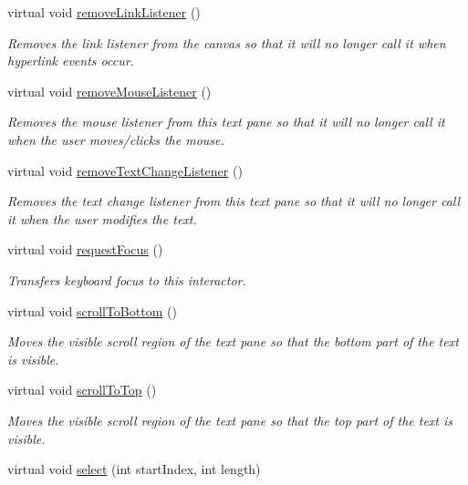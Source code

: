 \begin{DoxyCompactItemize}
virtual void \mbox{\hyperlink{classGBrowserPane_a263a2282597ca9f0f73301fb202ae390}{remove\+Link\+Listener}} ()
\begin{DoxyCompactList}\small\item\em Removes the link listener from the canvas so that it will no longer call it when hyperlink events occur. \end{DoxyCompactList}\item 
virtual void \mbox{\hyperlink{classGBrowserPane_aff47f71ce47e688a07c9d38dc92fcc11}{remove\+Mouse\+Listener}} ()
\begin{DoxyCompactList}\small\item\em Removes the mouse listener from this text pane so that it will no longer call it when the user moves/clicks the mouse. \end{DoxyCompactList}\item 
virtual void \mbox{\hyperlink{classGBrowserPane_a69c940b99d01eb7c353763ce4b0942a4}{remove\+Text\+Change\+Listener}} ()
\begin{DoxyCompactList}\small\item\em Removes the text change listener from this text pane so that it will no longer call it when the user modifies the text. \end{DoxyCompactList}\item 
virtual void \mbox{\hyperlink{classGInteractor_a519fb2ac767f8b2febbb50b898b8c8cb}{request\+Focus}} ()
\begin{DoxyCompactList}\small\item\em Transfers keyboard focus to this interactor. \end{DoxyCompactList}\item 
virtual void \mbox{\hyperlink{classGBrowserPane_ad4c9b6140b529865a6cdeed37a339237}{scroll\+To\+Bottom}} ()
\begin{DoxyCompactList}\small\item\em Moves the visible scroll region of the text pane so that the bottom part of the text is visible. \end{DoxyCompactList}\item 
virtual void \mbox{\hyperlink{classGBrowserPane_a9eacfcf7c186936ed957dd1c8a9c6b64}{scroll\+To\+Top}} ()
\begin{DoxyCompactList}\small\item\em Moves the visible scroll region of the text pane so that the top part of the text is visible. \end{DoxyCompactList}\item 
virtual void \mbox{\hyperlink{classGBrowserPane_aaeb1320c0553d0d2b8081b750f59a34a}{select}} (int start\+Index, int length)

\end{DoxyCompactItemize}
